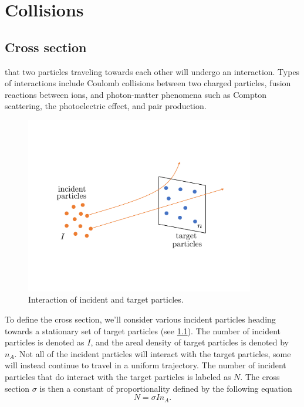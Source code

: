 \documentclass[a4paper,11pt]{report}
\begin{document}
\chapter{Collisions}

\section{Cross section}
that two particles traveling towards each other will undergo an interaction. Types of interactions include Coulomb collisions between two charged particles, fusion reactions between ions, and photon-matter phenomena such as Compton scattering, the photoelectric effect, and pair production.

\begin{figure}[ht]
    \centering
    \includegraphics[width=10cm]{../../images/cross_section.pdf}
    \caption{Interaction of incident and target particles.}
    \label{fig:cross_many_particles}
\end{figure}
To define the cross section, we'll consider various incident particles heading towards a stationary set of target particles (see \cref{fig:cross_many_particles}). The number of incident particles is denoted as $I$, and the areal density of target particles is denoted by $n_A$. Not all of the incident particles will interact with the target particles, some will instead continue to travel in a uniform trajectory. The number of incident particles that do interact with the target particles is labeled as $N$. The cross section $\sigma$ is then a constant of proportionality defined by the following equation
\begin{equation}
    \label{eq:cross_def}
    N = \sigma I n_A.
\end{equation}
\end{document}
